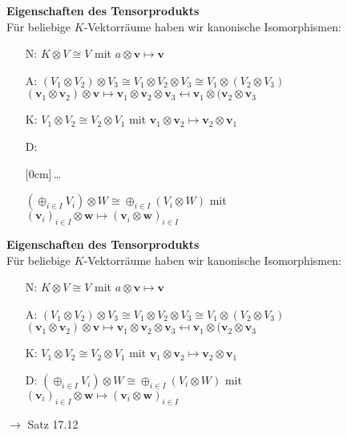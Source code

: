 \documentclass[11pt]{article}
\renewcommand{\cite}[1]{\par\bigskip\hfill{\color{gray}\tiny\(\to\) #1}}
\renewcommand{\vec}[1]{\mathbf{#1}}
\newcommand{\hide}[1]{\parbox{0cm}{\raisebox{-7pt}[0cm]{\dots}}\color{white}#1\color{black}}
\let\olddots\dots
\renewcommand{\dots}{\,\olddots\,}
\newenvironment{field}{}{\newpage}
\newif\ifnote
\newenvironment{note}{\notetrue}{\notefalse}
\begin{document}
\begin{note}
    \begin{field}
        \textbf{Eigenschaften des Tensorprodukts}\\
        Für beliebige $K$-Vektorräume haben wir kanonische Isomorphismen:
        \begin{itemize}
            \item[N:] $K\otimes V \cong V$ mit $a\otimes \vec{v} \mapsto \vec{v}$
            \item[A:] $(V_1\otimes V_2)\otimes V_3 \cong V_1\otimes V_2 \otimes V_3 \cong V_1\otimes (V_2\otimes V_3)$\\
            $(\vec{v}_1\otimes\vec{v}_2)\otimes\vec{v} \mapsto \vec{v}_1\otimes\vec{v}_2\otimes\vec{v}_3 \mapsfrom \vec{v}_1\otimes(\vec{v}_2\otimes\vec{v}_3$
            \item[K:] $V_1\otimes V_2 \cong V_2\otimes V_1$ mit
            $\vec{v}_1\otimes\vec{v}_2 \mapsto \vec{v}_2\otimes\vec{v}_1$
            \item[D:] \hide{$(\oplus_{i\in I} V_i)\otimes W \cong \oplus_{i\in I}(V_i\otimes W)$ mit \\
            $(\vec{v}_i)_{i\in I}\otimes \vec{w} \mapsto (\vec{v}_i\otimes \vec{w})_{i\in I}$}
        \end{itemize}
    \end{field}
    \begin{field}
        \textbf{Eigenschaften des Tensorprodukts}\\
        Für beliebige $K$-Vektorräume haben wir kanonische Isomorphismen:
        \begin{itemize}
            \item[N:] $K\otimes V \cong V$ mit $a\otimes \vec{v} \mapsto \vec{v}$
            \item[A:] $(V_1\otimes V_2)\otimes V_3 \cong V_1\otimes V_2 \otimes V_3 \cong V_1\otimes (V_2\otimes V_3)$\\
            $(\vec{v}_1\otimes\vec{v}_2)\otimes\vec{v} \mapsto \vec{v}_1\otimes\vec{v}_2\otimes\vec{v}_3 \mapsfrom \vec{v}_1\otimes(\vec{v}_2\otimes\vec{v}_3$
            \item[K:] $V_1\otimes V_2 \cong V_2\otimes V_1$ mit
            $\vec{v}_1\otimes\vec{v}_2 \mapsto \vec{v}_2\otimes\vec{v}_1$
            \item[D:] $(\oplus_{i\in I} V_i)\otimes W \cong \oplus_{i\in I}(V_i\otimes W)$ mit \\
            $(\vec{v}_i)_{i\in I}\otimes \vec{w} \mapsto (\vec{v}_i\otimes \vec{w})_{i\in I}$
        \end{itemize}
        \cite{Satz 17.12}
    \end{field}
\end{note}
\end{document}
